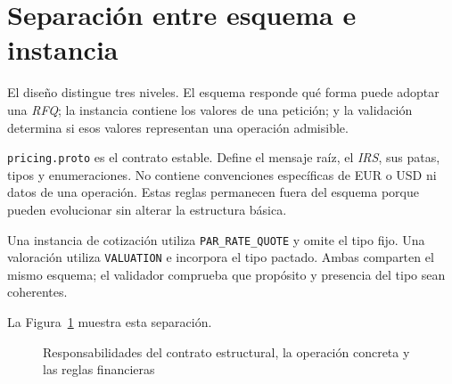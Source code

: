 \section{Separación entre esquema e instancia}
\label{sec:esquema_instancia}

El diseño distingue tres niveles. El esquema responde qué forma puede adoptar una \textit{RFQ}; la instancia contiene los valores de una petición; y la validación determina si esos valores representan una operación admisible.

\texttt{pricing.proto} es el contrato estable. Define el mensaje raíz, el \textit{IRS}, sus patas, tipos y enumeraciones. No contiene convenciones específicas de EUR o USD ni datos de una operación. Estas reglas permanecen fuera del esquema porque pueden evolucionar sin alterar la estructura básica.

Una instancia de cotización utiliza \texttt{PAR\_RATE\_QUOTE} y omite el tipo fijo. Una valoración utiliza \texttt{VALUATION} e incorpora el tipo pactado. Ambas comparten el mismo esquema; el validador comprueba que propósito y presencia del tipo sean coherentes.

La Figura~\ref{fig:esquema_instancia_validacion} muestra esta separación.

\begin{figure}[H]
    \centering
    \caption[Separación entre esquema, instancia y validación]{Responsabilidades del contrato estructural, la operación concreta y las reglas financieras}
    \label{fig:esquema_instancia_validacion}
\end{figure}

